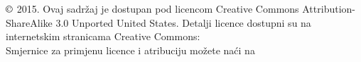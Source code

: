 \chapter*{}
\vfill



\noindent $\copyright$ 2015. Ovaj sadržaj je dostupan pod licencom Creative Commons Attribution-ShareAlike 3.0 Unported United States. Detalji licence dostupni su na internetskim stranicama Creative Commons:  \\

\noindent Smjernice za primjenu licence i atribuciju možete naći na 


\begin{comment}
	\noindent $\copyright$ 2015. This content is available under a Creative Commons Attribution-ShareAlike 3.0 Unported United States license. License details are available at the Creative Commons website: \urlwofont{http://www.creativecommons.org} \\

	\noindent For license and attribution guidance, see \urlwofont{https://github.com/OpenIntroOrg/openintro-statistics/blob/master/LICENSE}
\end{comment}